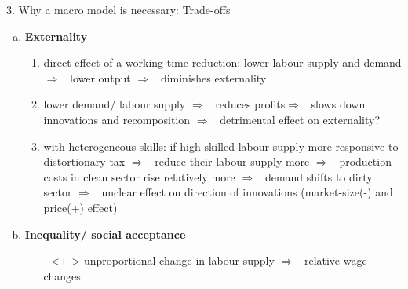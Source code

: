 \documentclass[11pt,aspectratio=169]{beamer}
\newcommand{\tr}[1]{\textcolor{blue}{#1}}
\newcommand{\ar}{$\Rightarrow$ \ }
\begin{document}
\begin{frame}{3. Why a macro model is necessary: Trade-offs}
\begin{enumerate}[a)]
\item \textbf{Externality}
\begin{enumerate}[1.] 
\item<+->  direct effect of a working time reduction: lower labour supply and demand \ar lower output \ar diminishes externality
\item<+-> lower demand/ labour supply \ar reduces profits\ar slows down innovations and recomposition \ar detrimental effect on externality?
\item<+-> with heterogeneous skills: if high-skilled labour supply more responsive to distortionary tax \ar reduce their labour supply more \ar production costs in clean sector rise relatively more \ar demand shifts to dirty sector \ar unclear effect on direction of innovations 
(market-size(-) and price(+) effect)
	\end{enumerate}

\item<+->	\textbf{Inequality/ social acceptance}
	\begin{itemize}
\item[-]<+-> unproportional change in labour supply \ar relative wage changes
	\end{itemize}
\end{enumerate}
\end{frame}
\end{document}
